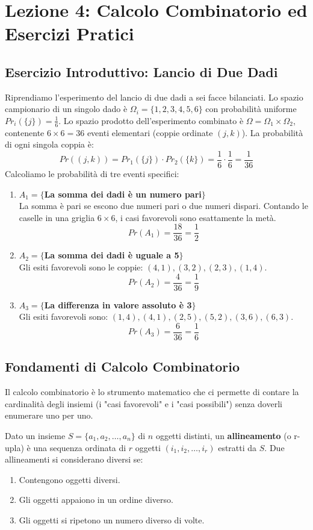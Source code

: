 \documentclass[12pt, a4paper]{article}
\begin{document}
\section{Lezione 4: Calcolo Combinatorio ed Esercizi Pratici}

\subsection{Esercizio Introduttivo: Lancio di Due Dadi}
Riprendiamo l'esperimento del lancio di due dadi a sei facce bilanciati.
Lo spazio campionario di un singolo dado è $\Omega_i = \{1, 2, 3, 4, 5, 6\}$ con probabilità uniforme $Pr_i(\{j\}) = \frac{1}{6}$.
Lo spazio prodotto dell'esperimento combinato è $\Omega = \Omega_1 \times \Omega_2$, contenente $6 \times 6 = 36$ eventi elementari (coppie ordinate $(j,k)$).
La probabilità di ogni singola coppia è:
$$ Pr((j,k)) = Pr_1(\{j\}) \cdot Pr_2(\{k\}) = \frac{1}{6} \cdot \frac{1}{6} = \frac{1}{36} $$
Calcoliamo le probabilità di tre eventi specifici:
\begin{enumerate}
    \item \textbf{$A_1 = \{$La somma dei dadi è un numero pari$\}$} \\
    La somma è pari se escono due numeri pari o due numeri dispari. Contando le caselle in una griglia $6\times6$, i casi favorevoli sono esattamente la metà.
    $$ Pr(A_1) = \frac{18}{36} = \frac{1}{2} $$
    \item \textbf{$A_2 = \{$La somma dei dadi è uguale a 5$\}$} \\
    Gli esiti favorevoli sono le coppie: $(4,1), (3,2), (2,3), (1,4)$.
    $$ Pr(A_2) = \frac{4}{36} = \frac{1}{9} $$
    \item \textbf{$A_3 = \{$La differenza in valore assoluto è 3$\}$} \\
    Gli esiti favorevoli sono: $(1,4), (4,1), (2,5), (5,2), (3,6), (6,3)$.
    $$ Pr(A_3) = \frac{6}{36} = \frac{1}{6} $$
\end{enumerate}

\subsection{Fondamenti di Calcolo Combinatorio}
Il calcolo combinatorio è lo strumento matematico che ci permette di contare la cardinalità degli insiemi (i "casi favorevoli" e i "casi possibili") senza doverli enumerare uno per uno. 

Dato un insieme $S = \{a_1, a_2, \dots, a_n\}$ di $n$ oggetti distinti, un \textbf{allineamento} (o r-upla) è una sequenza ordinata di $r$ oggetti $(i_1, i_2, \dots, i_r)$ estratti da $S$.
Due allineamenti si considerano diversi se:
\begin{enumerate}
    \item Contengono oggetti diversi.
    \item Gli oggetti appaiono in un ordine diverso.
    \item Gli oggetti si ripetono un numero diverso di volte.
\end{enumerate}
\end{document}
